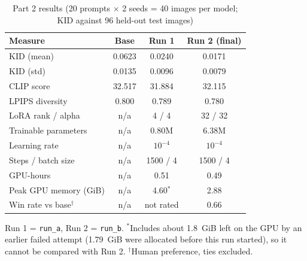 \begin{table}[!t]
\centering
\footnotesize
\setlength{\tabcolsep}{4pt}
\caption{Part 2 results (20 prompts $\times$ 2 seeds = 40 images per model; KID against 96 held-out test images)}
\label{tab:p2}
\begin{tabular}{lccc}
\toprule
Measure & Base & Run 1 & Run 2 (final) \\
\midrule
KID (mean) & 0.0623 & 0.0240 & 0.0171 \\
KID (std) & 0.0135 & 0.0096 & 0.0079 \\
CLIP score & 32.517 & 31.884 & 32.115 \\
LPIPS diversity & 0.800 & 0.789 & 0.780 \\
\midrule
LoRA rank / alpha & n/a & 4 / 4 & 32 / 32 \\
Trainable parameters & n/a & 0.80M & 6.38M \\
Learning rate & n/a & $10^{-4}$ & $10^{-4}$ \\
Steps / batch size & n/a & 1500 / 4 & 1500 / 4 \\
GPU-hours & n/a & 0.51 & 0.49 \\
Peak GPU memory (GiB) & n/a & 4.60$^{*}$ & 2.88 \\
\midrule
Win rate vs base$^{\dagger}$ & n/a & not rated & 0.66 \\
\bottomrule
\end{tabular}

\smallskip
\parbox{\columnwidth}{\scriptsize Run 1 = \texttt{run\_a}, Run 2 = \texttt{run\_b}. $^{*}$Includes about 1.8~GiB left on the GPU by an earlier failed attempt (1.79~GiB were allocated before this run started), so it cannot be compared with Run 2. $^{\dagger}$Human preference, ties excluded.}
\end{table}
